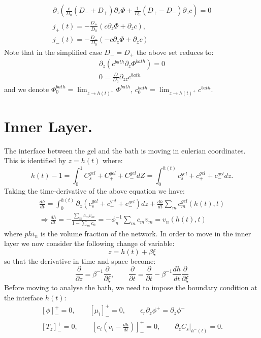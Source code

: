 \documentclass[12pt]{extarticle}
\begin{document}
\begin{gather}
\partial_z\left(\frac{c}{D_0}(D_-+D_+)\partial_z\Phi+\frac{1}{D_0}(D_+-D_-)\partial_zc\right)=0\\
j_+(t)= - \frac{D_+}{D_0}\left(c\partial_z\Phi + \partial_z c\right),\\
j_-(t)= - \frac{D_-}{D_0}\left(-c\partial_z\Phi + \partial_z c\right)
\end{gather}
Note that in the simplified case $D_-=D_+$ the above set reduces to:
\begin{gather}
\partial_z\left(c^{bath}\partial_z\Phi^{bath}\right)=0\\
0= \frac{D}{D_0} \partial_{zz} c^{bath}
\end{gather}
and we denote $\Phi^{bath}_0=\lim_{z\rightarrow h(t)^+} \Phi^{bath}$, $c^{bath}_0=\lim_{z\rightarrow h(t)^+} c^{bath}$.
\section{Inner Layer.}
The interface between the gel and the bath is moving in eulerian coordinates. This is identified by $z=h(t)$ where:
\begin{equation}
h(t)-1=\int_0^1{C^{gel}_s+C^{gel}_++C^{gel}_-}dZ = \int_0^{h(t)} c^{gel}_s+c^{gel}_++c^{gel}_- dz.
\end{equation}
Taking the time-derivative of the above equation we have:
\begin{equation}
\begin{aligned}
\frac{d h}{dt}=\int_0^{h(t)}\partial_z\left(c^{gel}_s+c^{gel}_++c^{gel}_-\right)dz + \frac{d h}{dt}\sum_m c^{gel}_m(h(t),t)\\
\Rightarrow \frac{d h}{dt}=-\frac{\sum_m c_m v_m}{1-\sum_m c_\alpha}=-\phi_n^{-1}\sum_m c_m v_m=v_n(h(t),t)
\end{aligned}
\end{equation}
where $phi_n$ is the volume fraction of the network. In order to move in the inner layer we now consider the following change of variable:
\begin{equation}
z= h(t)+ \beta \xi
\end{equation}
so that the derivative in time and space become:
\begin{equation}
\frac{\partial}{\partial z} = \beta^{-1}\frac{\partial}{\partial \xi}, \qquad \frac{\partial}{\partial t}= \frac{\partial}{\partial t} - \beta^{-1} \frac{d h}{dt} \frac{\partial}{\partial \xi}
\end{equation}
Before moving to analyse the bath, we need to impose the boundary condition at the interface $h(t)$:
\begin{equation}
\begin{aligned}
\left[\phi\right]^+_-=0, \qquad \left[\mu_i\right]^+_-=0, \qquad \epsilon_r \partial_z \phi^+=\partial_z \phi^-\\
\left[T_z\right]^+_-=0, \qquad \left[c_i\left(v_i-\frac{dh}{dt}\right)\right]^+_-=0, \qquad\left.\partial_z C_s \right|_{h^-(t)}=0.
\end{aligned}
\end{equation}
\end{document}
